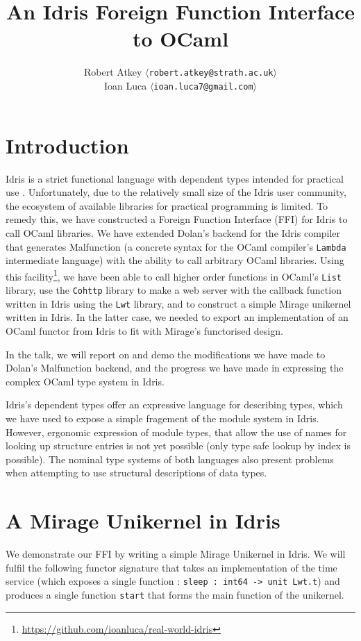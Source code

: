 \documentclass[a4paper,10pt,twocolumn]{article}
\title{An Idris Foreign Function Interface to OCaml}
\author{Robert Atkey  $\langle$\texttt{robert.atkey@strath.ac.uk}$\rangle$ \\
  Ioan Luca $\langle$\texttt{ioan.luca7@gmail.com}$\rangle$}
\date{}
\begin{document}
\maketitle

\section{Introduction}

Idris is a strict functional language with dependent types intended
for practical use \cite{tdd}. Unfortunately, due to the relatively
small size of the Idris user community, the ecosystem of available
libraries for practical programming is limited. To remedy this, we
have constructed a Foreign Function Interface (FFI) for Idris to call
OCaml libraries. We have extended Dolan's backend
\cite{dolan2016malfunctional} for the Idris compiler that generates
Malfunction (a concrete syntax for the OCaml compiler's
\texttt{Lambda} intermediate language) with the ability to call
arbitrary OCaml libraries. Using this 
facility\footnote{\url{https://github.com/ioanluca/real-world-idris}},
we have been able to
call higher order functions in OCaml's \texttt{List} library, use the
\texttt{Cohttp} library to make a web server with the callback
function written in Idris using the \texttt{Lwt} library, and to
construct a simple Mirage unikernel written in Idris. In the latter
case, we needed to export an implementation of an OCaml functor from
Idris to fit with Mirage's functorised design.

In the talk, we will report on and demo the modifications we have made
to Dolan's Malfunction backend, and the progress we have made in
expressing the complex OCaml type system in Idris.

Idris's dependent types offer an expressive language for describing
types, which we have used to expose a simple fragement of the module
system in Idris.  However, ergonomic expression of module types, that
allow the use of names for looking up structure entries is not yet
possible (only type safe lookup by index is possible). The nominal
type systems of both languages also present problems when attempting
to use structural descriptions of data types.

\section{A Mirage Unikernel in Idris}

We demonstrate our FFI by writing a simple Mirage Unikernel in
Idris. We will fulfil the following functor signature that takes an
implementation of the time service (which exposes a single function :
\texttt{sleep : int64 -> unit Lwt.t}) and produces a single function
\texttt{start} that forms the main function of the unikernel.
\end{document}
